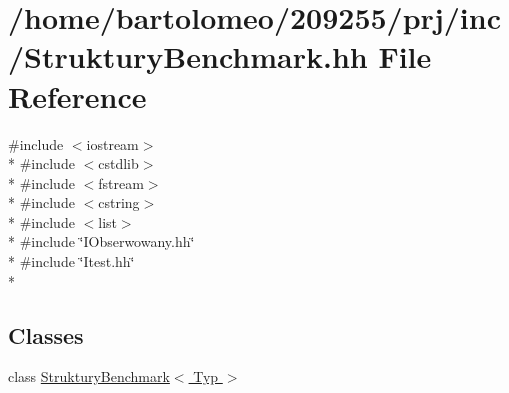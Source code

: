 \hypertarget{_struktury_benchmark_8hh}{\section{/home/bartolomeo/209255/prj/inc/\-Struktury\-Benchmark.hh File Reference}
\label{_struktury_benchmark_8hh}
}
{\ttfamily \#include $<$iostream$>$}\\*
{\ttfamily \#include $<$cstdlib$>$}\\*
{\ttfamily \#include $<$fstream$>$}\\*
{\ttfamily \#include $<$cstring$>$}\\*
{\ttfamily \#include $<$list$>$}\\*
{\ttfamily \#include \char`\"{}I\-Obserwowany.\-hh\char`\"{}}\\*
{\ttfamily \#include \char`\"{}Itest.\-hh\char`\"{}}\\*
\subsection*{Classes}
\begin{DoxyCompactItemize}
\item 
class \hyperlink{class_struktury_benchmark}{Struktury\-Benchmark$<$ Typ $>$}
\end{DoxyCompactItemize}
